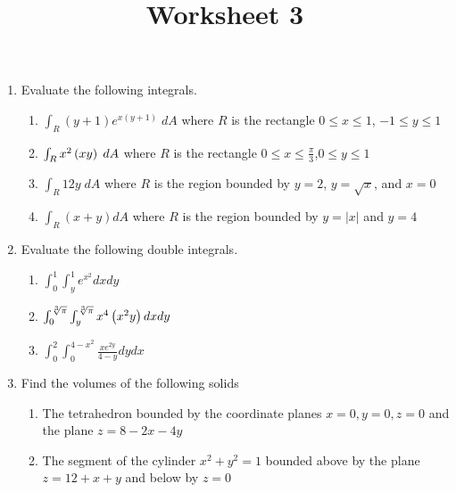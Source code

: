 \documentclass[12pt]{article}
\title{Worksheet 3}
\author{}\date{}
\let\cos\relax\DeclareMathOperator{\cos}{\mathsf{cos}}
\let\sec\relax\DeclareMathOperator{\sec}{\mathsf{sec}}
\begin{document}
\maketitle
\thispagestyle{empty}

\begin{enumerate}
\item Evaluate the following integrals.
\begin{enumerate}
\item $\int_R\left(y+1\right)e^{x\left(y+1\right)}\;dA$
where $R$ is the rectangle $0\le x\le 1$, $-1\le y\le 1$
\vspace{.75cm}
\item $\int_R x\sec^2\left(xy\right)\; dA$ where $R$
is the rectangle $0\le x\le\frac{\pi}{3}$,$0\le y\le 1$
\vspace{.75cm}
\item $\int_R12y\;dA$ where $R$ is the region bounded
by $y=2$, $y=\sqrt{x}$, and $x=0$
\vspace{.75cm}
\item $\int_R\left(x+y\right)dA$ where $R$ is the region
bounded by $y=\left|x\right|$ and $y=4$
\vspace{.75cm}
\end{enumerate}

\item Evaluate the following double integrals.
\begin{enumerate}
\item $\int_0^1\int_y^1e^{x^2}dxdy$
\vspace{.75cm}
\item $\int_0^{\sqrt[3]{\pi}}\int_y^{\sqrt[3]{\pi}}
x^4\cos\left(x^2y\right)dxdy$
\vspace{.75cm}
\item $\int_0^2\int_0^{4-x^2}\frac{xe^{2y}}{4-y}dydx$
\end{enumerate}

\item Find the volumes of the following solids
\begin{enumerate}
\item The tetrahedron bounded by the coordinate planes
$x=0,y=0,z=0$ and the plane $z=8-2x-4y$
\item The segment of the cylinder $x^2+y^2=1$ bounded
above by the plane $z=12+x+y$ and below by $z=0$
\end{enumerate}
\end{enumerate}
\end{document}
